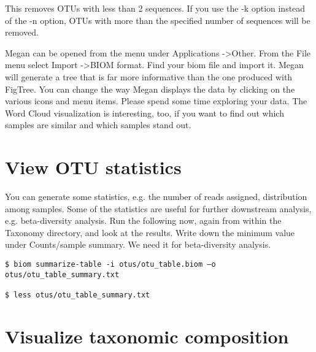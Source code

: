\documentclass[a4paper,12pt,twoside]{memoir}
\begin{document}
\begin{information}
This removes OTUs with less than 2 sequences. If you use the -k option instead of the -n option, OTUs with more than the specified number of sequences will be removed.

Megan can be opened from the menu under Applications -\textgreater Other. From the File menu select Import -\textgreater BIOM format. Find your biom file and import it. Megan will generate a tree that is far more informative than the one produced with FigTree. You can change the way Megan displays the data by clicking on the various icons and menu items. Please spend some time exploring your data. The Word Cloud visualization is interesting, too, if you want to find out which samples are similar and which samples stand out.
\end{information}

\newpage

\section{View OTU statistics}

\begin{information}
You can generate some statistics, e.g. the number of reads assigned, distribution among samples. Some of the statistics are useful for further downstream analysis, e.g. beta-diversity analysis. Run the following now, again from within the Taxonomy directory, and look at the results. Write down the minimum value under Counts/sample summary. We need it for beta-diversity analysis.
\end{information}

\begin{steps}
\begin{lstlisting}
$ biom summarize-table -i otus/otu_table.biom –o otus/otu_table_summary.txt

$ less otus/otu_table_summary.txt
\end{lstlisting}
\end{steps}

\section{Visualize taxonomic composition}
\end{document}
